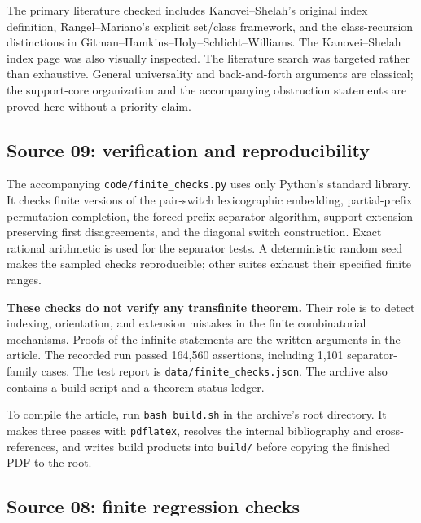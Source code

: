 \documentclass[11pt]{article}
\theoremstyle{definition}
\theoremstyle{remark}
\begin{document}
The primary literature checked includes Kanovei--Shelah's original
index definition, Rangel--Mariano's explicit set/class framework, and
the class-recursion distinctions in Gitman--Hamkins--Holy--Schlicht--Williams.
The Kanovei--Shelah index page was also visually inspected. The
literature search was targeted rather than exhaustive. General
universality and back-and-forth arguments are classical; the support-core
organization and the accompanying obstruction statements are proved
here without a priority claim.

\subsection{Source 09: verification and reproducibility}
\label{swo:ec:app:verification}
The accompanying \texttt{code/finite\_checks.py} uses only Python's
standard library. It checks finite versions of the pair-switch
lexicographic embedding, partial-prefix permutation completion, the
forced-prefix separator algorithm, support extension preserving first
disagreements, and the diagonal switch construction. Exact rational
arithmetic is used for the separator tests. A deterministic random seed
makes the sampled checks reproducible; other suites exhaust their
specified finite ranges.

\textbf{These checks do not verify any transfinite theorem.} Their role
is to detect indexing, orientation, and extension mistakes in the
finite combinatorial mechanisms. Proofs of the infinite statements
are the written arguments in the article. The recorded run passed 164,560 assertions, including 1,101 separator-family
cases. The test report is \texttt{data/finite\_checks.json}. The archive also contains a build
script and a theorem-status ledger.

To compile the article, run \texttt{bash build.sh} in the archive's root
directory. It makes three passes with \texttt{pdflatex}, resolves the
internal bibliography and cross-references, and writes build products
into \texttt{build/} before copying the finished PDF to the root.

\subsection{Source 08: finite regression checks}\label{swo:sk:app:tests}
\end{document}
